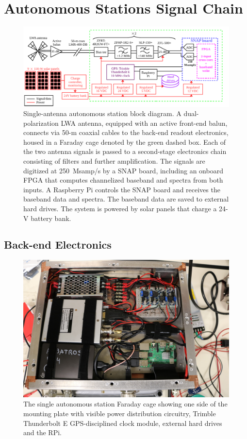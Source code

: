 \section{Autonomous Stations Signal Chain}

\begin{figure}
	\begin{center}
		\includegraphics[width=\linewidth]{Figures/albatros_single_schematic.pdf}
		\caption{Single-antenna autonomous station block diagram. A dual-polarization LWA antenna, equipped with an active front-end balun, connects via 50-m coaxial cables to the back-end readout electronics, housed in a Faraday cage denoted by the green dashed box. Each of the two antenna signals is passed to a second-stage electronics chain consisting of filters and further amplification.  The signals are digitized at 250~Msamp/s by a SNAP board, including an onboard FPGA that computes channelized baseband and spectra from both inputs.  A Raspberry Pi controls the SNAP board and receives the baseband data and spectra.  The baseband data are saved to external hard drives. The system is powered by solar panels that charge a 24-V battery bank.}
		\label{Fig:albatros1_schem}
	\end{center}
\end{figure}

\subsection{Back-end Electronics} 

\begin{figure}
	\centering
	\includegraphics[width=0.7\linewidth]{Figures/46966493985_44aa8ac326_o}
	\caption{The single autonomous station Faraday cage showing one side of the mounting plate with visible power distribution circuitry, Trimble Thunderbolt E GPS-disciplined clock module, external hard drives and the RPi.}
	\label{fig:46966493985_44aa8ac326_o}
\end{figure}

